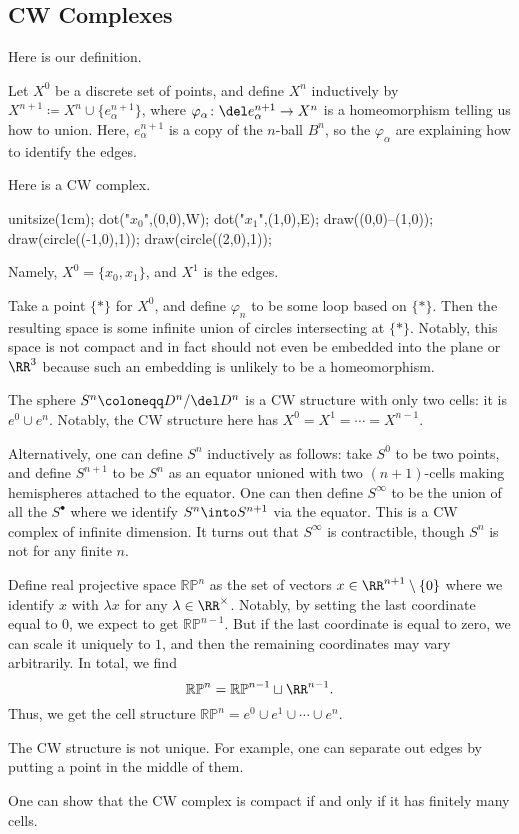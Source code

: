 \documentclass[../notes.tex]{subfiles}
\begin{document}
\subsection{CW Complexes}
Here is our definition.
\begin{definition}[CW complex]
	Let $X^0$ be a discrete set of points, and define $X^n$ inductively by $X^{n+1}\coloneqq X^n\cup\{e_\alpha^{n+1}\}$, where $\varphi_\alpha\colon\del e_\alpha^{n+1}\to X^n$ is a homeomorphism telling us how to union. Here, $e_\alpha^{n+1}$ is a copy of the $n$-ball $B^n$, so the $\varphi_\alpha$ are explaining how to identify the edges.
\end{definition}
\begin{example}
	Here is a CW complex.
	\begin{center}
		\begin{asy}
			unitsize(1cm);
			dot("$x_0$",(0,0),W);
			dot("$x_1$",(1,0),E);
			draw((0,0)--(1,0));
			draw(circle((-1,0),1));
			draw(circle((2,0),1));
		\end{asy}
	\end{center}
	Namely, $X^0=\{x_0,x_1\}$, and $X^1$ is the edges.
\end{example}
\begin{example}
	Take a point $\{*\}$ for $X^0$, and define $\varphi_n$ to be some loop based on $\{*\}$. Then the resulting space is some infinite union of circles intersecting at $\{*\}$. Notably, this space is not compact and in fact should not even be embedded into the plane or $\RR^3$ because such an embedding is unlikely to be a homeomorphism.
\end{example}
\begin{example}
	The sphere $S^n\coloneqq D^n/\del D^n$ is a CW structure with only two cells: it is $e^0\cup e^n$. Notably, the CW structure here has $X^0=X^1=\cdots=X^{n-1}$.
\end{example}
\begin{example}
	Alternatively, one can define $S^n$ inductively as follows: take $S^0$ to be two points, and define $S^{n+1}$ to be $S^n$ as an equator unioned with two $(n+1)$-cells making hemispheres attached to the equator. One can then define $S^\infty$ to be the union of all the $S^\bullet$ where we identify $S^n\into S^{n+1}$ via the equator. This is a CW complex of infinite dimension. It turns out that $S^\infty$ is contractible, though $S^n$ is not for any finite $n$.
\end{example}
\begin{example}
	Define real projective space $\mathbb{RP}^n$ as the set of vectors $x\in\RR^{n+1}\setminus\{0\}$ where we identify $x$ with $\lambda x$ for any $\lambda\in\RR^\times$. Notably, by setting the last coordinate equal to $0$, we expect to get $\mathbb{RP}^{n-1}$. But if the last coordinate is equal to zero, we can scale it uniquely to $1$, and then the remaining coordinates may vary arbitrarily. In total, we find
	\[\mathbb{RP}^n=\mathbb{RP}^{n-1}\sqcup\RR^{n-1}.\]
	Thus, we get the cell structure $\mathbb{RP}^n=e^0\cup e^1\cup\cdots\cup e^n$.
\end{example}
\begin{remark}
	The CW structure is not unique. For example, one can separate out edges by putting a point in the middle of them.
\end{remark}
One can show that the CW complex is compact if and only if it has finitely many cells.
\end{document}
